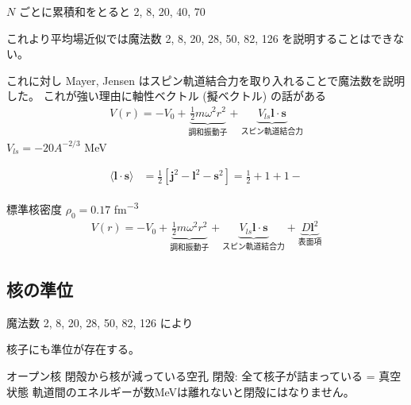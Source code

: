 \documentclass[uplatex,dvipdfmx,a4paper,11pt]{jlreq}
\numberwithin{equation}{section}
\theoremstyle{definition}
\begin{document}
$N$ ごとに累積和をとると 2, 8, 20, 40, 70

これより平均場近似では魔法数 2, 8, 20, 28, 50, 82, 126 を説明することはできない。

これに対し Mayer, Jensen はスピン軌道結合力を取り入れることで魔法数を説明した。
これが強い理由に軸性ベクトル (擬ベクトル) の話がある
\begin{align}
  V(r) = -V_0 + \underbrace{\frac{1}{2}m\omega^2r^2}_{調和振動⼦} + \underbrace{V_{ls}\bm{l}\cdot\bm{s}}_{スピン軌道結合力}
\end{align}
$V_{ls} = -20A^{-2/3}$ \si{MeV}

\begin{align}
  \langle \bm{l}\cdot\bm{s}\rangle & = \frac{1}{2}[\bm{j}^2 - \bm{l}^2 - \bm{s}^2] = \frac{1}{2} + 1 + 1-
\end{align}

標準核密度 $\rho_0 = 0.17$ \si{fm^{-3}}
\begin{align}
  V(r) = -V_0 + \underbrace{\frac{1}{2}m\omega^2r^2}_{調和振動⼦} + \underbrace{V_{ls}\bm{l}\cdot\bm{s}}_{スピン軌道結合力} + \underbrace{D\bm{l}^2}_{表面項}
\end{align}



\subsection{核の準位}
魔法数 2, 8, 20, 28, 50, 82, 126
により

核子にも準位が存在する。

オープン核
閉殻から核が減っている空孔
閉殻: 全て核⼦が詰まっている = 真空状態
軌道間のエネルギーが数MeVは離れないと閉殻にはなりません。
\end{document}
